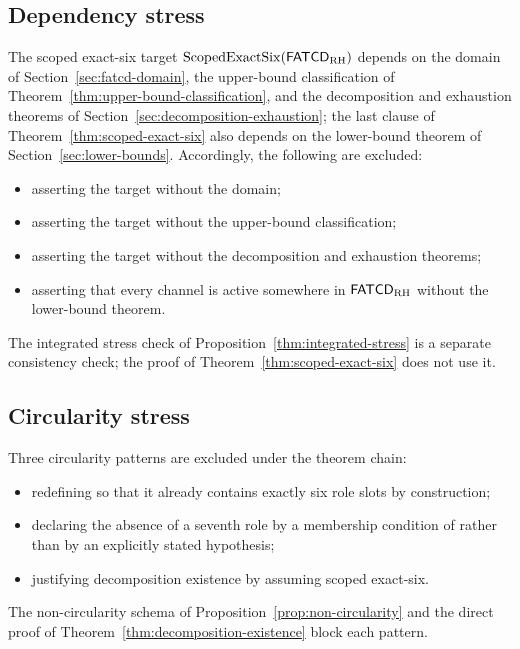 \subsection{Dependency stress}\label{subsec:dependency-stress}

\begin{remark}\label{prop:dependency-stress}
The scoped exact-six target \(\operatorname{ScopedExactSix}\!\left(\mathsf{FATCD}_{\mathrm{RH}}\right)\)
depends on the \FATCD{} domain of Section~\ref{sec:fatcd-domain}, the
upper-bound classification of Theorem~\ref{thm:upper-bound-classification},
and the decomposition and exhaustion theorems of
Section~\ref{sec:decomposition-exhaustion}; the last clause of
Theorem~\ref{thm:scoped-exact-six} also depends on the lower-bound theorem of
Section~\ref{sec:lower-bounds}. Accordingly, the following are excluded:
\begin{itemize}[topsep=2pt,itemsep=1pt]
  \item asserting the target without the \FATCD{} domain;
  \item asserting the target without the upper-bound classification;
  \item asserting the target without the decomposition and exhaustion
    theorems;
  \item asserting that every channel is active somewhere in
    \(\mathsf{FATCD}_{\mathrm{RH}}\) without the lower-bound theorem.
\end{itemize}
The integrated stress check of Proposition~\ref{thm:integrated-stress} is a
separate consistency check; the proof of Theorem~\ref{thm:scoped-exact-six}
does not use it.
\end{remark}

\subsection{Circularity stress}\label{subsec:circularity-stress}

\begin{remark}\label{prop:circularity-stress}
Three circularity patterns are excluded under the theorem chain:
\begin{itemize}[topsep=2pt,itemsep=1pt]
  \item redefining \FATCD{} so that it already contains exactly six role
    slots by construction;
  \item declaring the absence of a seventh role by a membership condition
    of \FATCD{} rather than by an explicitly stated hypothesis;
  \item justifying decomposition existence by assuming scoped
    exact-six.
\end{itemize}
The non-circularity schema of Proposition~\ref{prop:non-circularity} and
the direct proof of Theorem~\ref{thm:decomposition-existence}
block each pattern.
\end{remark}

